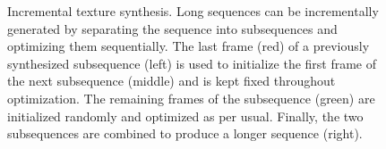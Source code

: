 \begin{figure}[t]
	\centering
	\caption[Incremental texture synthesis.]{Incremental texture synthesis.
	Long sequences can be incrementally generated by
separating the sequence into subsequences and optimizing them 
sequentially. The last frame (red) of a previously synthesized subsequence
(left) is used to initialize the first frame of the next subsequence (middle)
and is kept fixed throughout optimization. The remaining frames of the 
subsequence (green) are initialized randomly and optimized as per usual.
Finally, the two subsequences are combined to produce a longer
sequence (right).}
	\label{fig:incremental_synthesis}
\end{figure}

